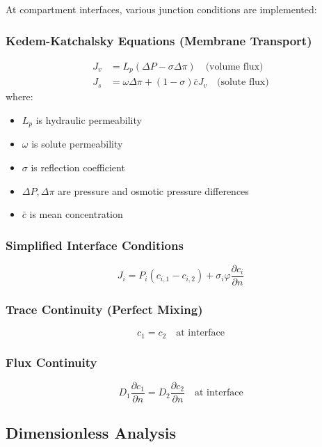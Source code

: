 \documentclass[11pt,a4paper]{article}
\begin{document}
At compartment interfaces, various junction conditions are implemented:

\subsubsection{Kedem-Katchalsky Equations (Membrane Transport)}
\begin{align}
J_v &= L_p(\Delta P - \sigma \Delta \pi) \quad \text{(volume flux)}\\
J_s &= \omega \Delta \pi + (1-\sigma) \bar{c} J_v \quad \text{(solute flux)}
\end{align}
where:
\begin{itemize}
    \item $L_p$ is hydraulic permeability
    \item $\omega$ is solute permeability
    \item $\sigma$ is reflection coefficient
    \item $\Delta P, \Delta \pi$ are pressure and osmotic pressure differences
    \item $\bar{c}$ is mean concentration
\end{itemize}

\subsubsection{Simplified Interface Conditions}
\begin{equation}
J_i = P_i(c_{i,1} - c_{i,2}) + \sigma_i \varphi \frac{\partial c_i}{\partial n}
\end{equation}

\subsubsection{Trace Continuity (Perfect Mixing)}
\begin{equation}
c_1 = c_2 \quad \text{at interface}
\end{equation}

\subsubsection{Flux Continuity}
\begin{equation}
D_1 \frac{\partial c_1}{\partial n} = D_2 \frac{\partial c_2}{\partial n} \quad \text{at interface}
\end{equation}

\subsection{Dimensionless Analysis}
\end{document}
